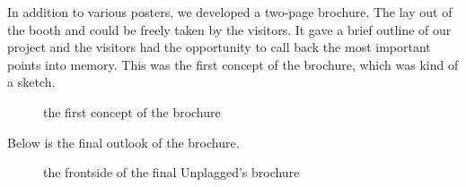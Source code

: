 In addition to various posters, we developed a two-page brochure. The lay out of the booth and could be freely taken by the visitors. It gave a brief outline of our project and the visitors had the opportunity to call back the most important points into memory.
This was the first concept of the brochure, which was kind of a sketch.





\begin{figure}[!hbtp]
  \centering
  \caption{the first concept of the brochure}
  \label{fig:brochure_sketch}
\end{figure}
\pagebreak
Below is the final outlook of the brochure.

\begin{figure}[!hbtp]
  \centering
  \caption{the frontside of the final Unplagged's brochure}
  \label{fig:brochure_final_frontside}
\end{figure}

